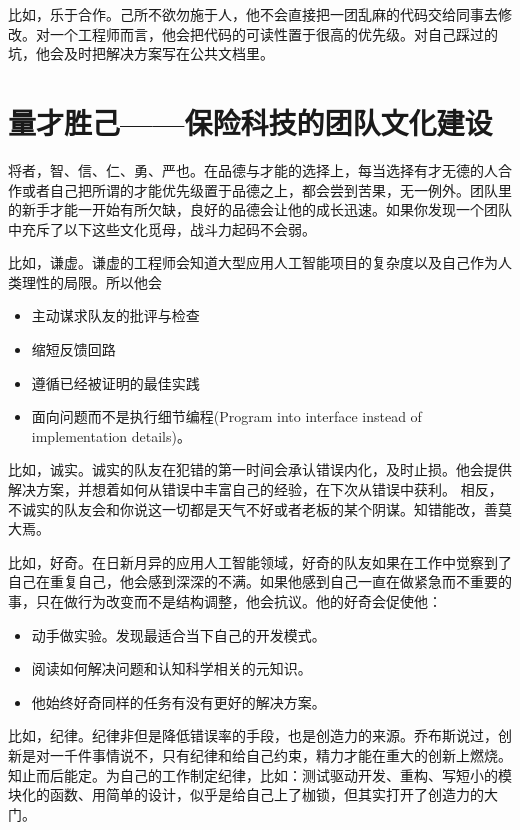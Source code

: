 \documentclass[
  oneside]{book}
\providecommand{\tightlist}{%
  \setlength{\itemsep}{0pt}\setlength{\parskip}{0pt}}
\begin{document}
比如，乐于合作。己所不欲勿施于人，他不会直接把一团乱麻的代码交给同事去修改。对一个工程师而言，他会把代码的可读性置于很高的优先级。对自己踩过的坑，他会及时把解决方案写在公共文档里。

\hypertarget{ux91cfux624dux80dcux5df1ux4fddux9669ux79d1ux6280ux7684ux56e2ux961fux6587ux5316ux5efaux8bbe}{%
\chapter{量才胜己------保险科技的团队文化建设}\label{ux91cfux624dux80dcux5df1ux4fddux9669ux79d1ux6280ux7684ux56e2ux961fux6587ux5316ux5efaux8bbe}}

将者，智、信、仁、勇、严也。在品德与才能的选择上，每当选择有才无德的人合作或者自己把所谓的才能优先级置于品德之上，都会尝到苦果，无一例外。团队里的新手才能一开始有所欠缺，良好的品德会让他的成长迅速。如果你发现一个团队中充斥了以下这些文化觅母，战斗力起码不会弱。

比如，谦虚。谦虚的工程师会知道大型应用人工智能项目的复杂度以及自己作为人类理性的局限。所以他会

\begin{itemize}
\tightlist
\item
  主动谋求队友的批评与检查
\item
  缩短反馈回路
\item
  遵循已经被证明的最佳实践
\item
  面向问题而不是执行细节编程(Program into interface instead of implementation details)。
\end{itemize}

比如，诚实。诚实的队友在犯错的第一时间会承认错误内化，及时止损。他会提供解决方案，并想着如何从错误中丰富自己的经验，在下次从错误中获利。
相反，不诚实的队友会和你说这一切都是天气不好或者老板的某个阴谋。知错能改，善莫大焉。

比如，好奇。在日新月异的应用人工智能领域，好奇的队友如果在工作中觉察到了自己在重复自己，他会感到深深的不满。如果他感到自己一直在做紧急而不重要的事，只在做行为改变而不是结构调整，他会抗议。他的好奇会促使他：

\begin{itemize}
\tightlist
\item
  动手做实验。发现最适合当下自己的开发模式。
\item
  阅读如何解决问题和认知科学相关的元知识。
\item
  他始终好奇同样的任务有没有更好的解决方案。
\end{itemize}

比如，纪律。纪律非但是降低错误率的手段，也是创造力的来源。乔布斯说过，创新是对一千件事情说不，只有纪律和给自己约束，精力才能在重大的创新上燃烧。
知止而后能定。为自己的工作制定纪律，比如：测试驱动开发、重构、写短小的模块化的函数、用简单的设计，似乎是给自己上了枷锁，但其实打开了创造力的大门。
\end{document}
